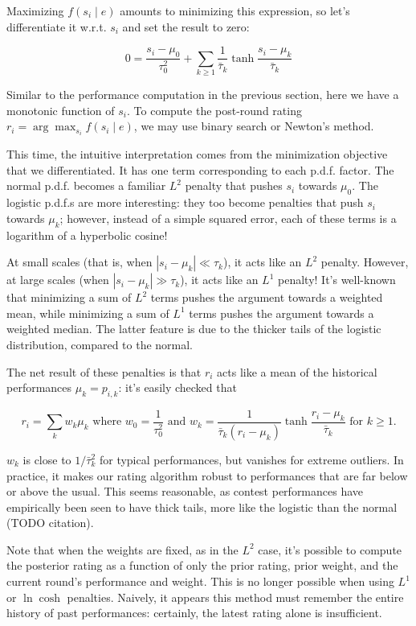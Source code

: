 \documentclass{article}
\begin{document}
Maximizing $f(s_i\mid e)$ amounts to minimizing this expression, so let's differentiate it w.r.t. $s_i$ and set the result to zero:

\[
0 = \frac{s_i-\mu_0}{\tau_0^2} + \sum_{k\ge 1} \frac{1}{\bar\tau_k} \tanh \frac {s_i-\mu_k} {\bar\tau_k}
\]

Similar to the performance computation in the previous section, here we have a monotonic function of $s_i$. To compute the post-round rating $r_i = \arg\max_{s_i} f(s_i \mid e)$, we may use binary search or Newton's method.

This time, the intuitive interpretation comes from the minimization objective that we differentiated. It has one term corresponding to each p.d.f. factor. The normal p.d.f. becomes a familiar $L^2$ penalty that pushes $s_i$ towards $\mu_0$. The logistic p.d.f.s are more interesting: they too become penalties that push $s_i$ towards $\mu_k$; however, instead of a simple squared error, each of these terms is a logarithm of a hyperbolic cosine!

At small scales (that is, when $|s_i-\mu_k| \ll \tau_k$), it acts like an $L^2$ penalty. However, at large scales (when $|s_i-\mu_k| \gg \tau_k$), it acts like an $L^1$ penalty! It's well-known that minimizing a sum of $L^2$ terms pushes the argument towards a weighted mean, while minimizing a sum of $L^1$ terms pushes the argument towards a weighted median. The latter feature is due to the thicker tails of the logistic distribution, compared to the normal.

The net result of these penalties is that $r_i$ acts like a mean of the historical performances $\mu_k = p_{i,k}$: it's easily checked that

\[r_i = \sum_k w_k \mu_k \text{ where } w_0 = \frac{1}{\tau_0^2} \text{ and }
w_k = \frac{1}{\bar\tau_k(r_i-\mu_k)}\tanh\frac{r_i-\mu_k}{\bar\tau_k} \text{ for }k\ge 1.\]

$w_k$ is close to $1/\bar\tau_k^2$ for typical performances, but vanishes for extreme outliers. In practice, it makes our rating algorithm robust to performances that are far below or above the usual. This seems reasonable, as contest performances have empirically been seen to have thick tails, more like the logistic than the normal (TODO citation).

Note that when the weights are fixed, as in the $L^2$ case, it's possible to compute the posterior rating as a function of only the prior rating, prior weight, and the current round's performance and weight. This is no longer possible when using $L^1$ or $\ln\cosh$ penalties. Naively, it appears this method must remember the entire history of past performances: certainly, the latest rating alone is insufficient.
\end{document}
